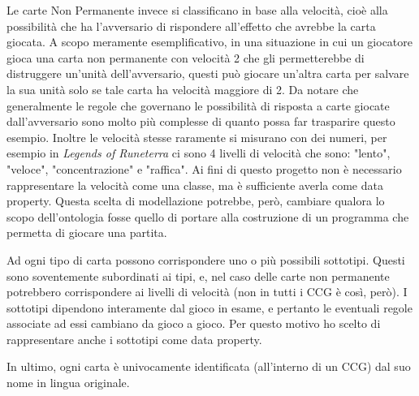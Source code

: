\documentclass[12pt]{article}
\begin{document}
Le carte Non Permanente invece si classificano in base alla velocità, cioè alla possibilità che ha l'avversario di rispondere all'effetto che avrebbe la carta giocata. A scopo meramente esemplificativo, in una situazione in cui un giocatore gioca una carta non permanente con velocità 2 che gli permetterebbe di distruggere un'unità dell'avversario, questi può giocare un'altra carta per salvare la sua unità solo se tale carta ha velocità maggiore di 2. Da notare che generalmente le regole che governano le possibilità di risposta a carte giocate dall'avversario sono molto più complesse di quanto possa far trasparire questo esempio. Inoltre le velocità stesse raramente si misurano con dei numeri, per esempio in \textit{Legends of Runeterra} ci sono 4 livelli di velocità che sono: "lento", "veloce", "concentrazione" e "raffica". \newline
Ai fini di questo progetto non è necessario rappresentare la velocità come una classe, ma è sufficiente averla come data property. Questa scelta di modellazione potrebbe, però, cambiare qualora lo scopo dell'ontologia fosse quello di portare alla costruzione di un programma che permetta di giocare una partita.

Ad ogni tipo di carta possono corrispondere uno o più possibili sottotipi. Questi sono soventemente subordinati ai tipi, e, nel caso delle carte non permanente potrebbero corrispondere ai livelli di velocità (non in tutti i CCG è così, però).
I sottotipi dipendono interamente dal gioco in esame, e pertanto le eventuali regole associate ad essi cambiano da gioco a gioco. Per questo motivo ho scelto di rappresentare anche i sottotipi come data property.

In ultimo, ogni carta è univocamente identificata (all'interno di un CCG) dal suo nome in lingua originale.
\end{document}
